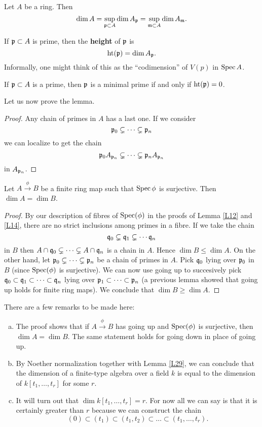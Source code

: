 \documentclass{../mathnotes}
\begin{document}
\begin{lem}
\label{L28}
Let $A$ be a ring. Then
\[\dim A=\sup_{\mathfrak p\subset A}\dim A_\mathfrak p=\sup_{\mathfrak m\subset A}\dim A_\mathfrak m.\]
\end{lem}

\begin{defn}
If $\mathfrak p\subset A$ is prime, then the \textbf{height} of $\mathfrak p$ is
\[\text{ht}(\mathfrak p)=\dim A_\mathfrak p.\]
Informally, one might think of this as the ``codimension'' of $V(p)$ in $\operatorname{Spec} A$.
\end{defn}

\begin{exc}
If $\mathfrak p\subset A$ is a prime, then $\mathfrak p$ is a minimal prime if and only if $\text{ht}(\mathfrak p)=0$.
\end{exc}

Let us now prove the lemma.
\begin{proof}
Any chain of primes in $A$ has a last one. If we consider
\[\mathfrak p_0\subsetneq\cdots\subsetneq\mathfrak p_n\]
we can localize to get the chain
\[\mathfrak p_0A_{\mathfrak p_n}\subsetneq\cdots\subsetneq\mathfrak p_nA_{\mathfrak p_n}\]
in $A_{\mathfrak p_n}$.
\end{proof}


\begin{lem}
\label{L29}
Let $A\overset{\phi}{\to}B$ be a finite ring map such that $\operatorname{Spec} \phi$ is surjective. Then $\dim A=\dim B$.
\end{lem}
\begin{proof}
By our description of fibres of $\operatorname{Spec}(\phi)$ in the proofs of Lemma \ref{L12} and \ref{L14}, there are no strict inclusions among primes in a fibre. If we take the chain
\[\mathfrak q_0\subsetneq\mathfrak q_1\subsetneq\cdots\mathfrak q_n\]
in $B$ then $A\cap\mathfrak q_0\subsetneq\cdots\subsetneq A\cap\mathfrak q_n$ is a chain in $A$. Hence $\dim B\leq\dim A$. On the other hand, let $\mathfrak p_0\subsetneq\cdots\subsetneq\mathfrak p_n$ be a chain of primes in $A$. Pick $\mathfrak q_0$ lying over $\mathfrak p_0$ in $B$ (since $\operatorname{Spec}(\phi)$ is surjective). We can now use going up to succesively pick $\mathfrak q_0\subset\mathfrak q_1\subset\cdots\subset\mathfrak q_n$ lying over $\mathfrak p_1\subset\cdots\subset\mathfrak p_n$ (a previous lemma showed that going up holds for finite ring maps). We conclude that $\dim B\geq\dim A$.
\end{proof}

\begin{rem}
There are a few remarks to be made here:
\begin{enumerate}[(a)]
\item The proof shows that if $A\overset{\phi}{\to}B$ has going up and $\operatorname{Spec}(\phi)$ is surjective, then $\dim A=\dim B$. The same statement holds for going down in place of going up.
\item By Noether normalization together with Lemma \ref{L29}, we can conclude that the dimension of a finite-type algebra over a field $k$ is equal to the dimension of $k[t_1,\ldots, t_r]$ for some $r$.
\item It will turn out that $\dim k[t_1,\ldots, t_r]=r$. For now all we can say is that it is certainly greater than $r$ because we can construct the chain
\[(0)\subset(t_1)\subset(t_1,t_2)\subset\ldots\subset(t_1,\ldots,t_r).\]
\end{enumerate}
\end{rem}
\end{document}
